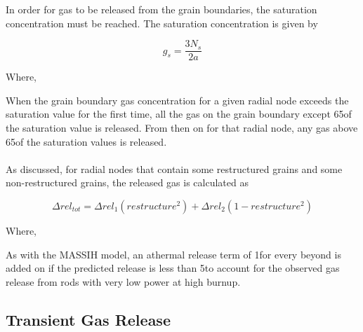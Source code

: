 In order for gas to be released from the grain boundaries, the saturation concentration must be
reached. The saturation concentration is given by

\begin{equation}
    \label{eq:FRAPFGR_saturation_concentration}
    g_{s} = \frac{3N_{s}}{2a}
\end{equation}

Where,


When the grain boundary gas concentration for a given radial node exceeds the saturation value for
the first time, all the gas on the grain boundary except 65\percent of the saturation value is
released.  From then on for that radial node, any gas above 65\percent of the saturation values is
released.
\\
\\
As discussed, for radial nodes that contain some restructured grains and some non-restructured
grains, the released gas is calculated as

\begin{equation}
    \label{eq:FRAPFGR_released_gas}
    {\Delta rel}_{tot} = {\Delta rel}_{1}\left( restructure^{2} \right) + {\Delta rel}_{2}\left( 1 - restructure^{2} \right)
\end{equation}

Where,

As with the MASSIH model, an athermal release term of 1\percent for every  beyond
 is added on if the predicted release is less than 5\percent to account for the
observed gas release from rods with very low power at high burnup.

\subsection{Transient Gas Release} \label{section:transient-gas-release}

